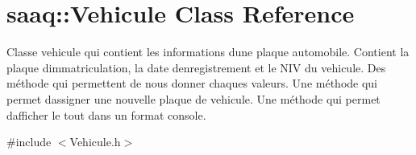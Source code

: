 \hypertarget{classsaaq_1_1Vehicule}{}\section{saaq\+:\+:Vehicule Class Reference}
\label{classsaaq_1_1Vehicule}


Classe vehicule qui contient les informations d\textquotesingle{}une plaque automobile. Contient la plaque d\textquotesingle{}immatriculation, la date d\textquotesingle{}enregistrement et le N\+IV du vehicule. Des méthode qui permettent de nous donner chaques valeurs. Une méthode qui permet d\textquotesingle{}assigner une nouvelle plaque de vehicule. Une méthode qui permet d\textquotesingle{}afficher le tout dans un format console.  




{\ttfamily \#include $<$Vehicule.\+h$>$}

